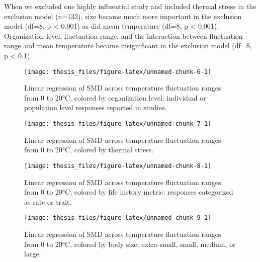 \documentclass[12pt,twoside]{reedthesis}
\begin{document}
When we excluded one highly influential study and included thermal stress in the exclusion model (n=132), size became much more important in the exclusion model (df=8, p \textless{} 0.001) as did mean temperature (df=8, p \textless{} 0.001). Organization level, fluctuation range, and the interaction between fluctuation range and mean temperature became insignificant in the exclusion model (df=8, p \textless{} 0.1).
\begin{figure}

{\centering \texttt{[image: thesis\_files/figure-latex/unnamed-chunk-6-1]} 

}

\caption[Effect sizes across temperature range by organization level]{Linear regression of SMD across temperature fluctuation ranges from 0 to 20°C, colored by organization level: individual or population level responses reported in studies.}\label{fig:unnamed-chunk-6}
\end{figure}
\clearpage
\begin{figure}

{\centering \texttt{[image: thesis\_files/figure-latex/unnamed-chunk-7-1]} 

}

\caption[Effect sizes across temperature range by thermal stress]{Linear regression of SMD across temperature fluctuation ranges from 0 to 20°C, colored by thermal stress.}\label{fig:unnamed-chunk-7}
\end{figure}
\begin{figure}

{\centering \texttt{[image: thesis\_files/figure-latex/unnamed-chunk-8-1]} 

}

\caption[Effect sizes across temperature range by response type]{Linear regression of SMD across temperature fluctuation ranges from 0 to 20°C, colored by life history metric: responses categorized as rate or trait.}\label{fig:unnamed-chunk-8}
\end{figure}
\begin{figure}

{\centering \texttt{[image: thesis\_files/figure-latex/unnamed-chunk-9-1]} 

}

\caption[Effect sizes across temperature range by body size]{Linear regression of SMD across temperature fluctuation ranges from 0 to 20°C, colored by body size: extra-small, small, medium, or large.}\label{fig:unnamed-chunk-9}
\end{figure}
\end{document}
